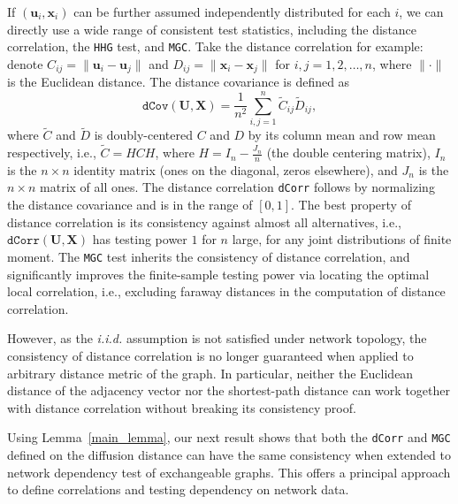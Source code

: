 \documentclass[11pt]{article}
\theoremstyle{definition}
\begin{document}
If $(\mathbf{u}_{i}, \mathbf{x}_{i} )$ can be further assumed independently distributed for each $i$, we can directly use a wide range of consistent test statistics, including the distance correlation, the \texttt{HHG} test, and \texttt{MGC}. Take the distance correlation for example: denote $C_{ij} = \parallel \mathbf{u}_{i} - \mathbf{u}_{j} \parallel$ and $D_{ij} = \parallel \mathbf{x}_{i} - \mathbf{x}_{j} \parallel$ for $i,j=1,2, \ldots ,n$, where $\parallel \cdot \parallel$ is the Euclidean distance. The distance covariance is defined as 
\begin{equation}	 
\label{eq:dCov}
\texttt{dCov}(\mathbf{U}, \mathbf{X}) = \frac{1}{n^2} \sum\limits_{i,j=1}^{n} \tilde{C}_{ij} \tilde{D}_{ij},
\end{equation}
where $\tilde{C}$ and $\tilde{D}$ is doubly-centered $C$ and $D$ by its column mean and row mean respectively, i.e., $\tilde{C}=HCH$, where $H=I_{n}-\frac{J_{n}}{n}$ (the double centering matrix), $I_n$ is the $n \times n$ identity matrix (ones on the diagonal, zeros elsewhere), and $J_n$ is the $n \times n$ matrix of all ones. The distance correlation \texttt{dCorr} follows by normalizing the distance covariance and is in the range of $[0,1]$. The best property of distance correlation is its consistency against almost all alternatives, i.e., $\texttt{dCorr}(\mathbf{U}, \mathbf{X})$ has testing power $1$ for $n$ large, for any joint distributions of finite moment. The \texttt{MGC} test inherits the consistency of distance correlation, and significantly improves the finite-sample testing power via locating the optimal local correlation, i.e., excluding faraway distances in the computation of distance correlation.

However, as the \textit{i.i.d.} assumption is not satisfied under network topology, the consistency of distance correlation is no longer guaranteed when applied to arbitrary distance metric of the graph. In particular, neither the Euclidean distance of the adjacency vector nor the shortest-path distance can work together with distance correlation without breaking its consistency proof. 

Using Lemma~\ref{main_lemma}, our next result shows that both the \texttt{dCorr} and \texttt{MGC} defined on the diffusion distance can have the same consistency when extended to network dependency test of exchangeable graphs. This offers a principal approach to define correlations and testing dependency on network data. 
\end{document}
